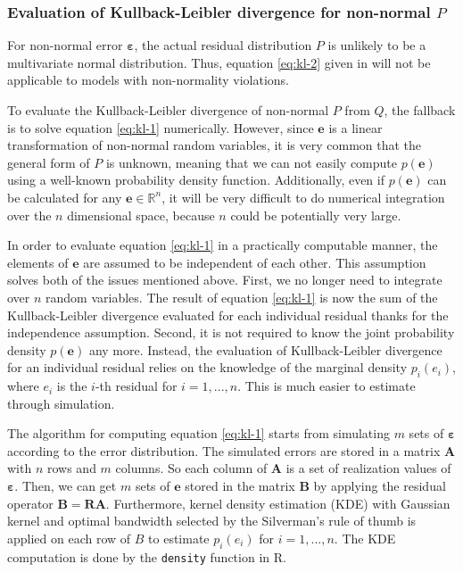 \documentclass[]{interact}
\theoremstyle{plain}%
\theoremstyle{definition}
\theoremstyle{remark}
\begin{document}
\hypertarget{evaluation-of-kullback-leibler-divergence-for-non-normal-p}{%
\subsubsection{\texorpdfstring{Evaluation of Kullback-Leibler divergence
for non-normal
\(P\)}{Evaluation of Kullback-Leibler divergence for non-normal P}}\label{evaluation-of-kullback-leibler-divergence-for-non-normal-p}}

For non-normal error \(\boldsymbol{\varepsilon}\), the actual residual
distribution \(P\) is unlikely to be a multivariate normal distribution.
Thus, equation \ref{eq:kl-2} given in \citet{li2023plot} will not be
applicable to models with non-normality violations.

To evaluate the Kullback-Leibler divergence of non-normal \(P\) from
\(Q\), the fallback is to solve equation \ref{eq:kl-1} numerically.
However, since \(\boldsymbol{e}\) is a linear transformation of
non-normal random variables, it is very common that the general form of
\(P\) is unknown, meaning that we can not easily compute
\(p(\boldsymbol{e})\) using a well-known probability density function.
Additionally, even if \(p(\boldsymbol{e})\) can be calculated for any
\(\boldsymbol{e} \in \mathbb{R}^n\), it will be very difficult to do
numerical integration over the \(n\) dimensional space, because \(n\)
could be potentially very large.

In order to evaluate equation \ref{eq:kl-1} in a practically computable
manner, the elements of \(\boldsymbol{e}\) are assumed to be independent
of each other. This assumption solves both of the issues mentioned
above. First, we no longer need to integrate over \(n\) random
variables. The result of equation \ref{eq:kl-1} is now the sum of the
Kullback-Leibler divergence evaluated for each individual residual
thanks for the independence assumption. Second, it is not required to
know the joint probability density \(p(\boldsymbol{e})\) any more.
Instead, the evaluation of Kullback-Leibler divergence for an individual
residual relies on the knowledge of the marginal density \(p_i(e_i)\),
where \(e_i\) is the \(i\)-th residual for \(i = 1, ..., n\). This is
much easier to estimate through simulation.

The algorithm for computing equation \ref{eq:kl-1} starts from
simulating \(m\) sets of \(\boldsymbol{\varepsilon}\) according to the
error distribution. The simulated errors are stored in a matrix
\(\boldsymbol{A}\) with \(n\) rows and \(m\) columns. So each column of
\(\boldsymbol{A}\) is a set of realization values of
\(\boldsymbol{\varepsilon}\). Then, we can get \(m\) sets of
\(\boldsymbol{e}\) stored in the matrix \(\boldsymbol{B}\) by applying
the residual operator \(\boldsymbol{B} = \boldsymbol{R}\boldsymbol{A}\).
Furthermore, kernel density estimation (KDE) with Gaussian kernel and
optimal bandwidth selected by the Silverman's rule of thumb
\citep{silverman2018density} is applied on each row of \(B\) to estimate
\(p_i(e_i)\) for \(i = 1, ..., n\). The KDE computation is done by the
\texttt{density} function in R.
\end{document}
